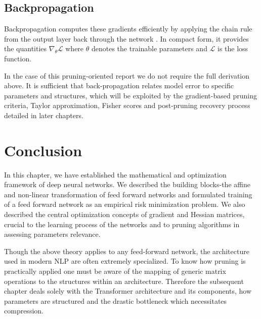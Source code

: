 \subsection{Backpropagation}

Backpropagation computes these gradients efficiently by applying the chain rule from the output layer back through the network \cite{Rumelhart1986}. In compact form, it provides the quantities
$\nabla_{\theta}\mathcal{L}$
where $\theta$ denotes the trainable parameters and $\mathcal{L}$ is the loss function.

In the case of this pruning-oriented report we do not require the full derivation above. It is sufficient that back-propagation relates model error to specific parameters and structures, which will be exploited by the gradient-based pruning criteria, Taylor approximation, Fisher scores and post-pruning recovery process detailed in later chapters.

\section{Conclusion}

In this chapter, we have established the mathematical and optimization framework of deep neural networks. We described the building blocks-the affine and non-linear transformation of feed forward networks and formulated training of a feed forward network as an empirical risk minimization problem. We also described the central optimization concepts of gradient and Hessian matrices, crucial to the learning process of the networks and to pruning algorithms in assessing parameters relevance.


Though the above theory applies to any feed-forward network, the architecture used in modern NLP are often extremely specialized. To know how pruning is practically applied one must be aware of the mapping of generic matrix operations to the structures within an architecture. Therefore the subsequent chapter deals solely with the Transformer architecture and its components, how parameters are structured and the drastic bottleneck which necessitates compression.